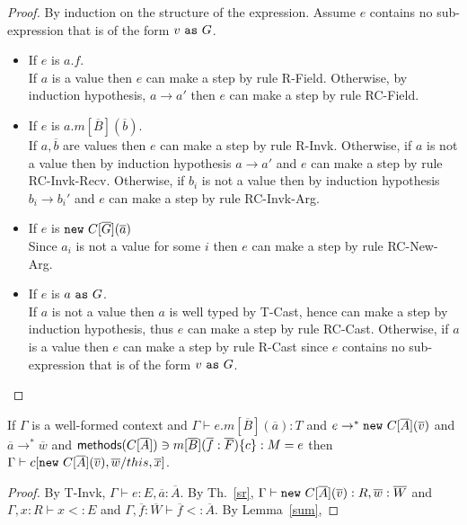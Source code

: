 \begin{proof}By induction on the structure of the expression. Assume $e$ contains no sub-expression that is of the form $v~{\tt as}~G$.
\begin{itemize}
\item If $e$ is $a.f$.\\
If $a$ is a value then $e$ can make a step by rule {\sc R-Field}. Otherwise, by induction hypothesis, $a\rightarrow a'$ then $e$ can make a step by rule {\sc RC-Field}.

\item If $e$ is $a.m[\overline{B}](\overline{b})$. \\
If $a,\overline{b}$ are values then $e$ can make a step by rule {\sc R-Invk}. 
Otherwise, if $a$ is not a value then by induction hypothesis $a\rightarrow a'$ and $e$ can make a step by rule {\sc RC-Invk-Recv}. Otherwise, if $b_i$ is not a value then by induction hypothesis $b_i\rightarrow b_i'$ and $e$ can make a step by rule {\sc RC-Invk-Arg}. 

\item If $e$ is ${\tt new}~C[\overline{G}](\overline{a})$\\
Since $a_i$ is not a value for some $i$ then $e$ can make a step by rule {\sc RC-New-Arg}.

\item If $e$ is $a~{\tt as}~G$.\\
If $a$ is not a value then $a$ is well typed by {\sc T-Cast}, hence can make a step by induction hypothesis, thus $e$ can make a step by rule {\sc RC-Cast}.
Otherwise, if $a$ is a value then $e$ can make a step by rule {\sc R-Cast} since $e$ contains no sub-expression that is of the form $v~{\tt as}~G$.
\end{itemize}
\end{proof}

\begin{thm} If $\Gamma$ is a well-formed context and $\Gamma \vdash e.m[\overline{B}](\overline{a}):T$ and $e \rightarrow^*{\tt new}~C[\overline{A}](\overline{v})$ and $\overline{a} \rightarrow^* \overline{w}$ and ${\sf methods}(C[\overline{A}])\ni m[\overline{B}](\overline{f}:\overline{F})\{c\}:M=e$ then $\Gamma\vdash c[{\tt new}~C[\overline{A}](\overline{v}),\overline{w}/this,\overline{x}]$.
\end{thm}

\begin{proof}
By {\sc T-Invk}, $\Gamma\vdash e:E, \overline{a}:\overline{A}$.
By Th.~\ref{sr}, $\Gamma \vdash{\tt new}~C[\overline{A}](\overline{v}):R, \overline{w}:\overline{W}$ and 
$\Gamma, x:R\vdash x<:E$ and $\Gamma, \overline{f}:\overline{W}\vdash \overline{f}<:\overline{A}$. By Lemma~\ref{sum},
\end{proof}
